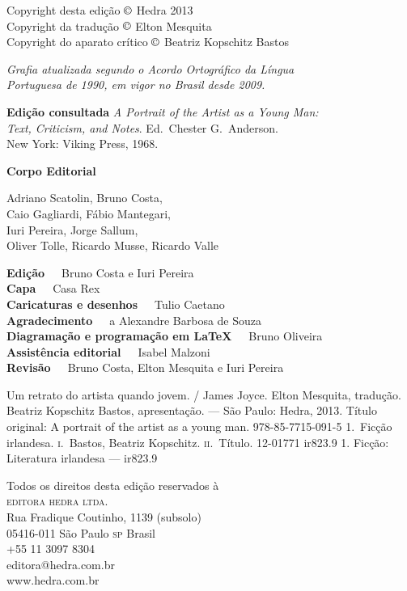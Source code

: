 
\begingroup
\parindent0mm\parskip0mm
\footnotesize
\thispagestyle{empty}

Copyright desta edição $\copyright$ Hedra 2013\\
Copyright da tradução $\copyright$ Elton Mesquita\\
Copyright do aparato crítico $\copyright$ Beatriz Kopschitz Bastos\medskip

{\itshape
Grafia atualizada segundo o Acordo Ortográfico da Língua\\
Portuguesa de 1990, em vigor no Brasil desde 2009. 
}\medskip

\textbf{Edição consultada}
\textit{A Portrait of the Artist as a Young Man:\\ 
Text, Criticism, and Notes}. Ed.~Chester G.~Anderson.\\
 New York: Viking Press, 1968.\smallskip

\textbf{Corpo Editorial}

Adriano Scatolin,
Bruno Costa,\\
Caio Gagliardi,
Fábio Mantegari,\\
Iuri Pereira,
Jorge Sallum,\\
Oliver Tolle,
Ricardo Musse,
Ricardo Valle\smallskip

\textbf{Edição}\ \ \  Bruno Costa e Iuri Pereira\\
\textbf{Capa}\ \ \  Casa Rex\\
\textbf{Caricaturas e desenhos}\ \ \ Tulio Caetano\\
\textbf{Agradecimento}\ \ \ a Alexandre Barbosa de Souza\\
\textbf{Diagramação e programação em \LaTeX}\ \ \  Bruno Oliveira\\
\textbf{Assistência editorial}\ \ \  Isabel Malzoni\\
\textbf{Revisão}\ \ \ Bruno Costa, Elton Mesquita e Iuri Pereira

{Um retrato do artista quando jovem. / James Joyce. Elton Mesquita, tradução.
Beatriz Kopschitz Bastos, apresentação. --- São Paulo: Hedra, 2013.}
{Título original: A portrait of the artist as a young man.}
{978-85-7715-091-5}
{1.~Ficção irlandesa. \textsc{i}.~Bastos, Beatriz Kopschitz.  \textsc{ii}.~Título.}
{12-01771}
{ir823.9}
{1. Ficção: Literatura irlandesa --- ir823.9}

Todos os direitos desta edição reservados à\\
\textsc{editora hedra ltda.}\\
Rua Fradique Coutinho, 1139 (subsolo)\\
05416-011 São Paulo \textsc{sp} Brasil\\
+55 11 3097 8304\\
editora@hedra.com.br\\
www.hedra.com.br
\endgroup

\clearpage 

